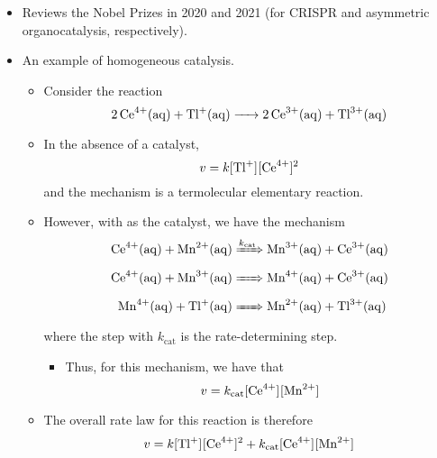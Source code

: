 \documentclass[../notes.tex]{subfiles}
\begin{document}
\begin{itemize}
\begin{itemize}
    \end{itemize}
    \item Reviews the Nobel Prizes in 2020 and 2021 (for CRISPR and asymmetric organocatalysis, respectively).
    \item An example of homogeneous catalysis.
    \begin{itemize}
        \item Consider the reaction
        \begin{equation*}
            \ce{2Ce^4+(aq) + Tl+(aq) -> 2Ce^3+(aq) + Tl^3+(aq)}
        \end{equation*}
        \item In the absence of a catalyst,
        \begin{equation*}
            v = k\cnc{Tl+}\cnc{Ce^4+}^2
        \end{equation*}
        and the mechanism is a termolecular elementary reaction.
        \item However, with  as the catalyst, we have the mechanism
        \begin{align*}
            \ce{Ce^4+(aq) + Mn^2+(aq)} &\xRightarrow{k_\text{cat}}                \ce{Mn^3+(aq) + Ce^3+(aq)}\\
            \ce{Ce^4+(aq) + Mn^3+(aq)} &\xRightarrow{{\color{white}k_\text{cat}}} \ce{Mn^4+(aq) + Ce^3+(aq)}\\
            \ce{Mn^4+(aq) + Tl+(aq)}   &\xRightarrow{{\color{white}k_\text{cat}}} \ce{Mn^2+(aq) + Tl^3+(aq)}
        \end{align*}
        where the step with $k_\text{cat}$ is the rate-determining step.
        \begin{itemize}
            \item Thus, for this mechanism, we have that
            \begin{equation*}
                v = k_\text{cat}\cnc{Ce^4+}\cnc{Mn^2+}
            \end{equation*}
        \end{itemize}
        \item The overall rate law for this reaction is therefore
        \begin{equation*}
            v = k\cnc{Tl+}\cnc{Ce^4+}^2+k_\text{cat}\cnc{Ce^4+}\cnc{Mn^2+}
        \end{equation*}
    \end{itemize}
\end{itemize}
\end{document}
